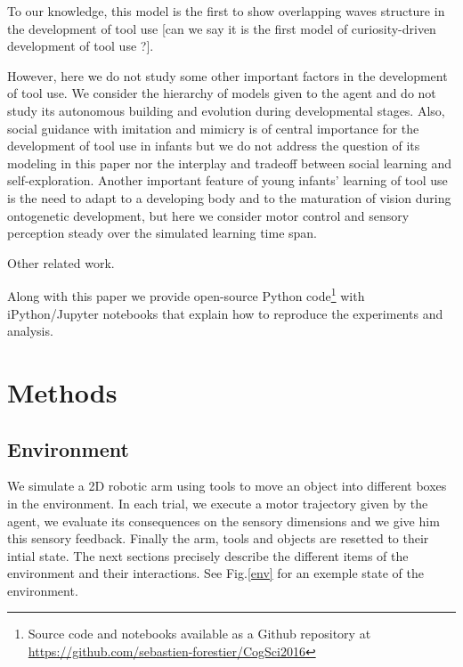 \documentclass[10pt,letterpaper]{article}
\begin{document}
	To our knowledge, this model is the first to show overlapping waves structure in the development of tool use [can we say it is the first model of curiosity-driven development of tool use ?].
	
	However, here we do not study some other important factors in the development of tool use.
	We consider the hierarchy of models given to the agent and do not study its autonomous building and evolution during developmental stages.
	Also, social guidance with imitation and mimicry is of central importance for the development of tool use in infants but we do not address the question
	of its modeling in this paper nor the interplay and tradeoff between social learning and self-exploration.
	Another important feature of young infants' learning of tool use is the need to adapt to a developing body and to the maturation of vision during ontogenetic development, 
	but here we consider motor control and sensory perception steady over the simulated learning time span.
	
	
	Other related work.
	\cite{ugur2015}
	\cite{schmerlinggoal}
	\cite{forestier2015}
	\cite{unifying}

	Along with this paper we provide open-source Python code\footnote{Source code and notebooks available as a Github repository at \url{https://github.com/sebastien-forestier/CogSci2016}} 
	with iPython/Jupyter notebooks that explain how to reproduce the experiments and analysis. 
	
	
%

\section{Methods}

	\subsection{Environment}
	
		We simulate a 2D robotic arm using tools to move an object into different boxes in the environment. 		
		In each trial, we execute a motor trajectory given by the agent, we evaluate its consequences on the sensory dimensions and we give him
		this sensory feedback. Finally the arm, tools and objects are resetted to their intial state.
		The next sections precisely describe the different items of the environment and their interactions.	
		See Fig.\ref{env} for an exemple state of the environment. 
		
\end{document}
